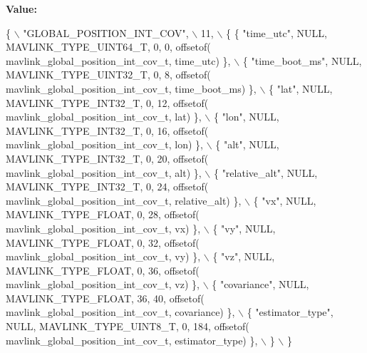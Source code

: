 {\bfseries Value\+:}
\begin{DoxyCode}
\{ \(\backslash\)
    \textcolor{stringliteral}{"GLOBAL\_POSITION\_INT\_COV"}, \(\backslash\)
    11, \(\backslash\)
    \{  \{ \textcolor{stringliteral}{"time\_utc"}, NULL, MAVLINK_TYPE_UINT64_T, 0, 0, offsetof(
      mavlink_global_position_int_cov_t, time\_utc) \}, \(\backslash\)
         \{ \textcolor{stringliteral}{"time\_boot\_ms"}, NULL, MAVLINK_TYPE_UINT32_T, 0, 8, offsetof(
      mavlink_global_position_int_cov_t, time\_boot\_ms) \}, \(\backslash\)
         \{ \textcolor{stringliteral}{"lat"}, NULL, MAVLINK_TYPE_INT32_T, 0, 12, offsetof(
      mavlink_global_position_int_cov_t, lat) \}, \(\backslash\)
         \{ \textcolor{stringliteral}{"lon"}, NULL, MAVLINK_TYPE_INT32_T, 0, 16, offsetof(
      mavlink_global_position_int_cov_t, lon) \}, \(\backslash\)
         \{ \textcolor{stringliteral}{"alt"}, NULL, MAVLINK_TYPE_INT32_T, 0, 20, offsetof(
      mavlink_global_position_int_cov_t, alt) \}, \(\backslash\)
         \{ \textcolor{stringliteral}{"relative\_alt"}, NULL, MAVLINK_TYPE_INT32_T, 0, 24, offsetof(
      mavlink_global_position_int_cov_t, relative\_alt) \}, \(\backslash\)
         \{ \textcolor{stringliteral}{"vx"}, NULL, MAVLINK_TYPE_FLOAT, 0, 28, offsetof(
      mavlink_global_position_int_cov_t, vx) \}, \(\backslash\)
         \{ \textcolor{stringliteral}{"vy"}, NULL, MAVLINK_TYPE_FLOAT, 0, 32, offsetof(
      mavlink_global_position_int_cov_t, vy) \}, \(\backslash\)
         \{ \textcolor{stringliteral}{"vz"}, NULL, MAVLINK_TYPE_FLOAT, 0, 36, offsetof(
      mavlink_global_position_int_cov_t, vz) \}, \(\backslash\)
         \{ \textcolor{stringliteral}{"covariance"}, NULL, MAVLINK_TYPE_FLOAT, 36, 40, offsetof(
      mavlink_global_position_int_cov_t, covariance) \}, \(\backslash\)
         \{ \textcolor{stringliteral}{"estimator\_type"}, NULL, MAVLINK_TYPE_UINT8_T, 0, 184, offsetof(
      mavlink_global_position_int_cov_t, estimator\_type) \}, \(\backslash\)
         \} \(\backslash\)
\}
\end{DoxyCode}
\mbox{\label{mavlink__msg__global__position__int__cov_8h_aeb7307a971bc80c366171f46a1251c17}} 
